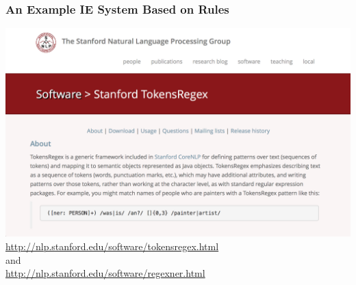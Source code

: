 \documentclass{beamer}
\begin{document}
\begin{frame}
  \frametitle{An Example IE System Based on Rules}
  \centering
  \includegraphics[width=\linewidth]{tokensregex}\\
  \footnotesize\url{http://nlp.stanford.edu/software/tokensregex.html} \\and\\ \url{http://nlp.stanford.edu/software/regexner.html}
\end{frame}




\end{document}
